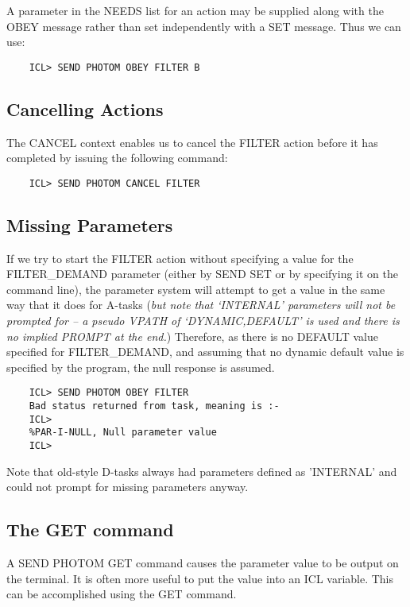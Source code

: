 A parameter in the NEEDS list for an action may be supplied along with the
OBEY message rather than set independently with a SET message. Thus we
can use:

\begin{verbatim}
    ICL> SEND PHOTOM OBEY FILTER B
\end{verbatim}
                           
\subsection{Cancelling Actions}

The CANCEL context enables us to cancel the FILTER action before it has
completed by issuing the following command:

\begin{verbatim}
    ICL> SEND PHOTOM CANCEL FILTER
\end{verbatim}
                               
\subsection{Missing Parameters}

If we try to start the FILTER action without specifying a value for the 
FILTER\_DEMAND parameter (either by SEND SET or by specifying it on the 
command line), the parameter system will attempt to get a value in the
same way that it does for A-tasks ({\em but note that `INTERNAL' parameters
will not be prompted for -- a pseudo VPATH of `DYNAMIC,DEFAULT' is used and
there is no implied PROMPT at the end.})
Therefore, as there is no DEFAULT value specified for FILTER\_DEMAND, and
assuming that no dynamic default value is specified by the program, the
null response is assumed.

\begin{verbatim}
    ICL> SEND PHOTOM OBEY FILTER
    Bad status returned from task, meaning is :-
    ICL>
    %PAR-I-NULL, Null parameter value
    ICL>
\end{verbatim}

Note that old-style D-tasks always had parameters defined as 'INTERNAL'
and could not prompt for missing parameters anyway.

\subsection{The GET command}

A SEND PHOTOM GET command causes the parameter value to be output on the
terminal. It is often more useful to put the value into an ICL variable.
This can be accomplished using the GET command.

